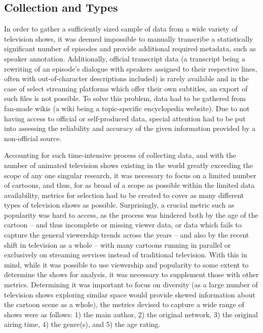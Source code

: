 \documentclass[a4paper, 11pt]{article}
\begin{document}
\subsection{Collection and Types} \label{dat:col}
In order to gather a sufficiently sized sample of data from a wide variety of television shows, it was deemed impossible to manually transcribe a statistically significant number of episodes and provide additional required metadata, such as speaker annotation. Additionally, official transcript data (a transcript being a rewriting of an episode's dialogue with speakers assigned to their respective lines, often with out-of-character descriptions included) is rarely available and in the case of select streaming platforms which offer their own subtitles, an export of such files is not possible. To solve this problem, data had to be gathered from fan-made wikis (a wiki being a topic-specific encyclopedia website). Due to not having access to official or self-produced data, special attention had to be put into assessing the reliability and accuracy of the given information provided by a non-official source.

Accounting for such time-intensive process of collecting data, and with the number of animated television shows existing in the world greatly exceeding the scope of any one singular research, it was necessary to focus on a limited number of cartoons, and thus, for as broad of a scope as possible within the limited data availability, metrics for selection had to be created to cover as many different types of television shows as possible. Surprisingly, a crucial metric such as popularity was hard to access, as the process was hindered both by the age of the cartoon -- and thus incomplete or missing viewer data, or data which fails to capture the general viewership trends across the years -- and also by the recent shift in television as a whole -- with many cartoons running in parallel or exclusively on streaming services instead of traditional television. With this in mind, while it was possible to use viewership and popularity to some extent to determine the shows for analysis, it was necessary to supplement those with other metrics. Determining it was important to focus on diversity (as a large number of television shows exploring similar space would provide skewed information about the cartoon scene as a whole), the metrics devised to capture a wide range of shows were as follows: 1) the main author, 2) the original network, 3) the original airing time, 4) the genre(s), and 5) the age rating.
\end{document}
